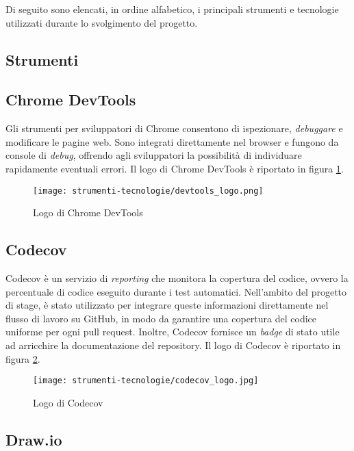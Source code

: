 \par Di seguito sono elencati, in ordine alfabetico, i principali strumenti e tecnologie utilizzati durante lo svolgimento del progetto.

\subsection{Strumenti}

\subsection*{Chrome DevTools}

\par Gli strumenti per sviluppatori di Chrome consentono di ispezionare, \textit{debuggare} e modificare le pagine web. Sono integrati direttamente nel browser e fungono da console di \textit{debug}, offrendo agli sviluppatori la possibilità di individuare rapidamente eventuali errori. Il logo di Chrome DevTools è riportato in figura \ref{fig:logo_chrome_devtools}.

\begin{figure}[H]
  \centering 
  \texttt{[image: strumenti-tecnologie/devtools\_logo.png]} 
  \caption{Logo di Chrome DevTools}
  \label{fig:logo_chrome_devtools}
\end{figure}

\subsection*{Codecov}

\par Codecov è un servizio di \textit{reporting} che monitora la copertura del codice, ovvero la percentuale di codice eseguito durante i test automatici. Nell’ambito del progetto di stage, è stato utilizzato per integrare queste informazioni direttamente nel flusso di lavoro su GitHub, in modo da garantire una copertura del codice uniforme per ogni \gls{pull request}. Inoltre, Codecov fornisce un \textit{badge} di stato utile ad arricchire la documentazione del \gls{repository}. Il logo di Codecov è riportato in figura \ref{fig:logo_codecov}.

\begin{figure}[H]
  \centering 
  \texttt{[image: strumenti-tecnologie/codecov\_logo.jpg]} 
  \caption{Logo di Codecov}
  \label{fig:logo_codecov}
\end{figure}

\subsection*{Draw.io}

